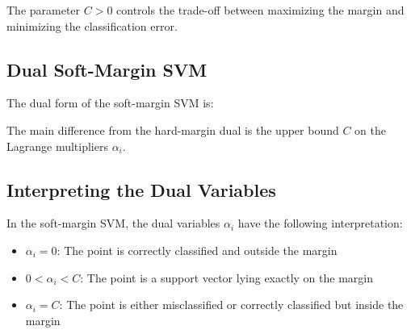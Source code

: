 \documentclass{article}
\begin{document}

The parameter $C > 0$ controls the trade-off between maximizing the margin and minimizing the classification error.

\subsection{Dual Soft-Margin SVM}
The dual form of the soft-margin SVM is:


The main difference from the hard-margin dual is the upper bound $C$ on the Lagrange multipliers $\alpha_i$.

\subsection{Interpreting the Dual Variables}
In the soft-margin SVM, the dual variables $\alpha_i$ have the following interpretation:

\begin{itemize}
    \item $\alpha_i = 0$: The point is correctly classified and outside the margin
    \item $0 < \alpha_i < C$: The point is a support vector lying exactly on the margin
    \item $\alpha_i = C$: The point is either misclassified or correctly classified but inside the margin
\end{itemize}
\end{document}
